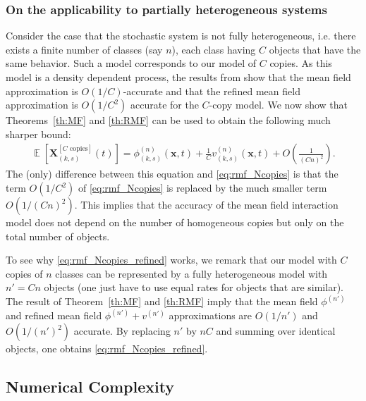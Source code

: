 \documentclass[acmsmall]{acmart}
\newcommand\bx{\mathbf{x}}
\newcommand\toN{^{(n)}}
\newcommand{\ncopies}{^{[C\text{ copies}]}}
\DeclareMathOperator{\E}{\mathbb{E}} %
\newcommand\esp[1]{\E\left[#1\right]} %
\newcommand\p[1]{\left(#1\right)} %
\begin{document}

\subsubsection*{On the applicability to partially heterogeneous systems}

Consider the case that the stochastic system is not fully heterogeneous, i.e. there exists a finite number of classes (say $n$), each class having $C$ objects that have the same behavior. Such a model corresponds to our model of $C$ copies. As this model is a density dependent process, the results from \cite{gast2017refined,gastSizeExpansionsMean2019} show that the mean field approximation is $O(1/C)$-accurate and that the refined mean field approximation is $O(1/C^2)$ accurate for the $C$-copy model.  We now show that Theorems~\ref{th:MF} and \ref{th:RMF} can be used to obtain the following much sharper bound:
\begin{align}
  \label{eq:rmf_Ncopies_refined}
  \esp{\mathbf{X}\ncopies_{(k,s)}(t)} = \phi\toN_{(k,s)}(\bx,t) + \frac1C v\toN_{(k,s)}(\bx,t) + O\p{\frac{1}{(Cn)^2}}.
\end{align}
The (only) difference between this equation and \eqref{eq:rmf_Ncopies} is that the term $O(1/C^2)$ of \eqref{eq:rmf_Ncopies} is replaced by the much smaller term $O(1/(Cn)^2)$. This implies that the accuracy of the mean field interaction model does not depend on the number of homogeneous copies but only on the total number of objects. 

To see why \eqref{eq:rmf_Ncopies_refined} works, we remark that our model with $C$ copies of $n$ classes can be represented by a fully heterogeneous model with $n'=Cn$ objects (one just have to use equal rates for objects that are similar). The result of Theorem~\ref{th:MF} and \ref{th:RMF} imply that the mean field $\phi^{(n')}$ and refined mean field $\phi^{(n')}+v^{(n')}$ approximations are $O(1/n')$ and $O(1/(n')^2)$ accurate.  By replacing $n'$ by $nC$ and summing over identical objects, one obtains \eqref{eq:rmf_Ncopies_refined}.


\subsection{Numerical Complexity}
\label{sec:numerical_complexity}
\end{document}
